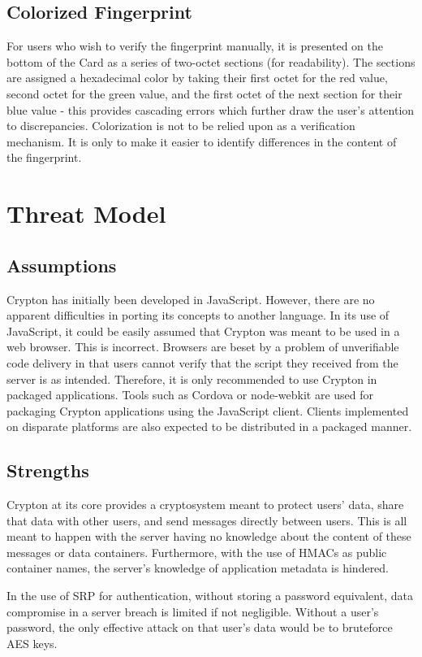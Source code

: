 \documentclass[conference]{IEEEtran}
\begin{document}
\subsection{Colorized Fingerprint}
For users who wish to verify the fingerprint manually, it is presented on the
bottom of the Card as a series of two-octet sections (for readability). The
sections are assigned a hexadecimal color by taking their first octet for the
red value, second octet for the green value, and the first octet of the next section
for their blue value - this provides cascading errors which further draw the user's
attention to discrepancies. Colorization is not to be relied upon as a verification
mechanism. It is only to make it easier to identify differences in the content of the fingerprint.

\section{Threat Model}
\subsection{Assumptions}
Crypton has initially been developed in JavaScript. However, there are no
apparent difficulties in porting its concepts to another language.
In its use of JavaScript, it could be easily assumed that Crypton was meant to
be used in a web browser. This is incorrect. Browsers are beset by a problem of
unverifiable code delivery in that users cannot verify that the script they received
from the server is as intended. Therefore, it is only recommended to use
Crypton in packaged applications. Tools such as Cordova\cite{cordova} or
node-webkit\cite{nodewebkit} are
used for packaging Crypton applications using the JavaScript client.
Clients implemented on disparate platforms are also expected to be distributed
in a packaged manner.

\subsection{Strengths}
Crypton at its core provides a cryptosystem meant to protect users' data,
share that data with other users, and send messages directly between users.
This is all meant to happen with the server having no knowledge about the content
of these messages or data containers. Furthermore, with the use of HMACs as public 
container names, the server's knowledge of application metadata is hindered.

In the use of SRP for authentication, without storing a password equivalent,
data compromise in a server breach is limited if not negligible. Without a user's
password, the only effective attack on that user's data would be to bruteforce
AES keys.
\end{document}
